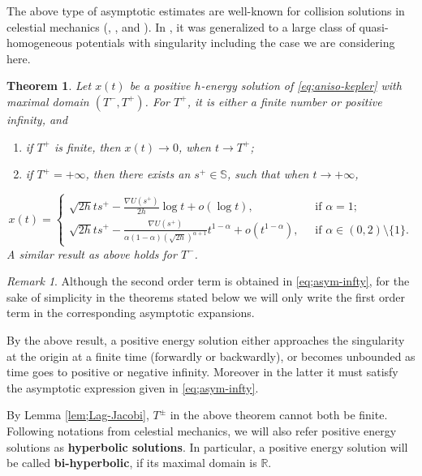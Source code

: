 \documentclass[11pt]{amsart}
\newcommand{\rr}{\mathbb R}
\newcommand{\bs}{\mathbb S}
\newcommand{\al}{\alpha}
\theoremstyle{plain}
\newtheorem{thm}{Theorem}[section]
\theoremstyle{definition}
\theoremstyle{remark}
\newtheorem{rem}{Remark}[section]
\begin{document}
The above type of asymptotic estimates are well-known for collision solutions in celestial mechanics (\cite{Wt41}, \cite{Sp70}, \cite{C98} and \cite{FT04}). In \cite{BFT08}, it was generalized to a large class of quasi-homogeneous potentials with singularity including the case we are considering here.  

\begin{thm} \label{thm;asym} Let $x(t)$ be a positive $h$-energy solution of \eqref{eq;aniso-kepler} with maximal domain $(T^-, T^+)$. For $T^+$, it is either a finite number or positive infinity, and
\begin{enumerate}
\item[(a).] if $T^+$ is finite, then $x(t) \to 0$, when $t \to T^{+}$;
\item[(b).] if $T^{+} = + \infty$, then there exists an $s^{+} \in \bs$, such that when $t \to +\infty$, 
\end{enumerate}
\begin{equation} \label{eq;asym-infty}
 x(t) =
\begin{cases}
\sqrt{2h} t s^{+}-\frac{\nabla U(s^{+})}{2h} \log t+ o(\log t), \; & \text{ if } \al =1;\\
\sqrt{2h} t s^+ -\frac{\nabla U(s^+)}{\al(1-\al)(\sqrt{2h})^{\al+1}} t^{1-\al} + o(t^{1-\al}), \; & \text{ if } \al \in (0, 2) \setminus \{1\}.
\end{cases}
\end{equation} 
A similar result as above holds for $T^-$.
\end{thm}

\begin{rem}
	Although the second order term is obtained in \eqref{eq;asym-infty}, for the sake of simplicity in the theorems stated below we will only write the first order term in the corresponding asymptotic expansions. 
\end{rem}

By the above result, a positive energy solution either approaches the singularity at the origin at a finite time (forwardly or backwardly), or becomes unbounded as time goes to positive or negative infinity. Moreover in the latter it must satisfy the asymptotic expression given in \eqref{eq;asym-infty}. 
 
By Lemma \ref{lem;Lag-Jacobi}, $T^{\pm}$ in the above theorem cannot both be finite. Following notations from celestial mechanics, we will also refer positive energy solutions as \textbf{hyperbolic solutions}. In particular, a positive energy solution will be called \textbf{bi-hyperbolic}, if its maximal domain is $\rr$. 
 
\end{document}
